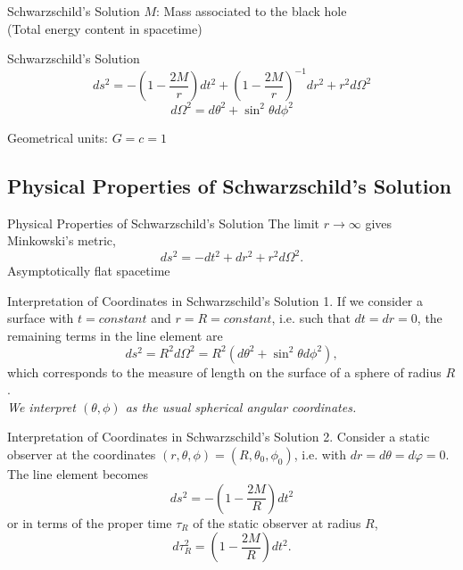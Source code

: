 \documentclass{beamer}
\begin{document}
\begin{darkframes}
\begin{frame}{Schwarzschild's Solution}
            $M$: Mass associated to the black hole \\
            (Total energy content in spacetime)
    	\end{frame}
	
    	\begin{frame}{Schwarzschild's Solution}
    		$$ ds^2 = - \left( 1 - \frac{2M}{r} \right) dt^2 
            + \left( 1 - \frac{2M}{r} \right)^{-1} dr^2 
            + r^2 d\Omega^{2} $$
            \pause
            $$ d\Omega^{2} = d\theta^2 + \sin^2 \theta d\phi^2 $$
            \bigskip
            
            Geometrical units: $ G = c = 1$ 
    	\end{frame}
        
        \subsection{Physical Properties of Schwarzschild's Solution}
    	\begin{frame}{Physical Properties of Schwarzschild's Solution}
    		The limit $r \rightarrow \infty $ gives Minkowski's metric,
            $$ ds^{2}=-dt^{2}+dr^{2}+r^{2}d\Omega^{2}. $$
            \pause
            \centering
            {Asymptotically flat spacetime}
    	\end{frame}
        
        \begin{frame}{Interpretation of Coordinates in Schwarzschild's Solution}
			1. If we consider a surface with $t = constant $ and $r = R = constant$, i.e. such that $dt = dr = 0$, the remaining terms in the line element are	
			$$ ds^2 = R^2 d\Omega^2 = R^2 \left( d\theta^2 + \sin^{2} \theta d\phi^2 \right),$$
which corresponds to the measure of length on the surface of a sphere
of radius $R$.\\ 
\textit{We interpret $\left(\theta,\phi\right)$
as the usual spherical angular coordinates.}
    	\end{frame}
        
        \begin{frame}{Interpretation of Coordinates in Schwarzschild's Solution}
			2. Consider a static observer at the coordinates	$\left( r, \theta, \phi \right) = \left( R, \theta_0, \phi_0 \right)$, i.e. with $dr = d\theta = d\varphi = 0$.\\

The line element becomes
$$ ds^2 = -\left( 1 - \frac{2M}{R} \right) dt^2 $$
or in terms of the proper time $\tau_{R}$ of the static observer
at radius $R$,
$$ d\tau_R^2=\left( 1 - \frac{2M}{R} \right) dt^2. $$
    	\end{frame}
        

\end{darkframes}
\end{document}
